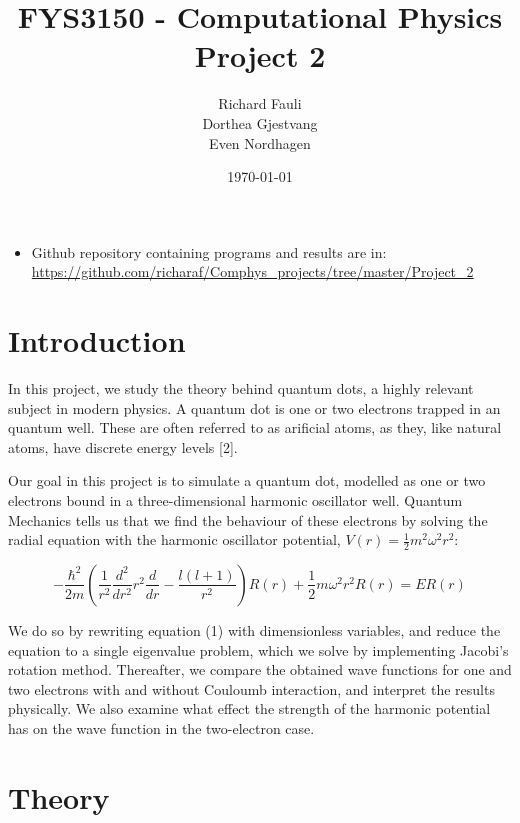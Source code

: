 \documentclass[norsk,a4paper,12pt]{article}
\title{FYS3150 - Computational Physics\\\vspace{2mm} \Large{Project 2}}
\author{\large Richard Fauli\\ Dorthea Gjestvang\\ Even Nordhagen}
\date{\today}
\begin{document}
\maketitle

\begin{abstract}
\end{abstract}
\begin{itemize}
\item Github repository containing programs and results are in: \url{https://github.com/richaraf/Comphys_projects/tree/master/Project_2}
\end{itemize}
\section{Introduction}
In this project, we study the theory behind quantum dots, a highly relevant subject in modern physics. A quantum dot is one or two electrons trapped in an quantum well. These are often referred to as arificial atoms, as they, like natural atoms, have discrete energy levels [2].  

Our goal in this project is to simulate a quantum dot, modelled as one or two electrons bound in a three-dimensional harmonic oscillator well. Quantum Mechanics tells us that we find the behaviour of these electrons by solving the radial equation with the harmonic oscillator potential, $V(r) = \frac{1}{2}m^2\omega^2r^2$:

\begin{equation}
    - \frac{\hbar^2}{2m}(\frac{1}{r^2}\frac{d^2}{dr^2}r^2\frac{d}{dr} - \frac{l(l+1)}{r^2})R(r) + \frac{1}{2}m\omega^2r^2R(r) = ER(r)
\end{equation}
\vspace{3mm}

We do so by rewriting equation (1) with dimensionless variables, and reduce the equation to a single eigenvalue problem, which we solve by implementing Jacobi's rotation method. Thereafter, we compare the obtained wave functions for one and two electrons with and without Couloumb interaction, and interpret the results physically. We also examine what effect the strength of the harmonic potential has on the wave function in the two-electron case.

\section{Theory}
\end{document}

